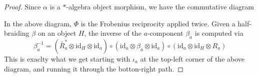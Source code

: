 \documentclass[a4paper,11pt,reqno]{amsart}
\numberwithin{equation}{section}
\theoremstyle{remark}
\theoremstyle{definition}
\newcommand{\cC}{\mathcal C}
\newcommand{\cS}{\mathcal S}
\newcommand{\id}{\mathrm{id}}
\newcommand{\Hilb}{\mathrm{Hilb}}
\begin{document}
\begin{proof}
	Since $\alpha$ is a $*$-algebra object morphism, we have the commutative diagram
	\begin{center}
	\end{center}
	In the above diagram, $\Phi$ is the Frobenius reciprocity applied twice.
	Given a half-braiding $\beta$ on an object $H$, the inverse of the $a$-component $\beta_a$ is computed via
	\[
	\beta_a^{-1} = (\bar{R}_a^* \otimes \id_H \otimes \id_a) \circ (\id_a \otimes \beta_{\bar{a}} \otimes \id_a) \circ (\id_a \otimes \id_H \otimes R_a)
	\]
	This is exaclty what we get starting with $\iota_a$ at the top-left corner of the above diagram, and running it through the botton-right path.
\end{proof}
\end{document}
